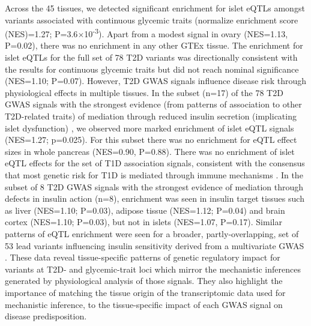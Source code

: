 Across the 45 tissues, we detected significant enrichment for islet eQTLs amongst variants associated with continuous glycemic traits (normalize enrichment score (NES)=1.27; P=3.6$\times$10\textsuperscript{-3}). Apart from a modest signal in ovary (NES=1.13, P=0.02), there was no enrichment in any other GTEx tissue. The enrichment for islet eQTLs for the full set of 78 T2D variants was directionally consistent with the results for continuous glycemic traits but did not reach nominal significance (NES=1.10; P=0.07). However, T2D GWAS signals influence disease risk through physiological effects in multiple tissues. In the subset (n=17) of the 78 T2D GWAS signals with the strongest evidence (from patterns of association to other T2D-related traits) of mediation through reduced insulin secretion (implicating islet dysfunction) \cite{mahajanRefiningAccuracyValidated2018, dimasImpactTypeDiabetes2014, woodGenomeWideAssociationStudy2017}, we observed more marked enrichment of islet eQTL signals (NES=1.27; p=0.025). For this subset there was no enrichment for eQTL effect sizes in whole pancreas (NES=0.90, P=0.88). There was no enrichment of islet eQTL effects for the set of T1D association signals, consistent with the consensus that most genetic risk for T1D is mediated through immune mechanisms \cite{onengut-gumuscuFineMappingType2015}.
In the subset of 8 T2D GWAS signals with the strongest evidence of mediation through defects in insulin action (n=8), enrichment was seen in insulin target tissues such as liver (NES=1.10; P=0.03), adipose tissue (NES=1.12; P=0.04) and brain cortex (NES=1.10; P=0.03), but not in islets (NES=1.07, P=0.17). Similar patterns of eQTL enrichment were seen for a broader, partly-overlapping, set of 53 lead variants influencing insulin sensitivity derived from a multivariate GWAS \cite{lottaIntegrativeGenomicAnalysis2017}. 
These data reveal tissue-specific patterns of genetic regulatory impact for variants at T2D- and glycemic-trait loci which mirror the mechanistic inferences generated by physiological analysis of those signals. They also highlight the importance of matching the tissue origin of the transcriptomic data used for mechanistic inference, to the tissue-specific impact of each GWAS signal on disease predisposition.

